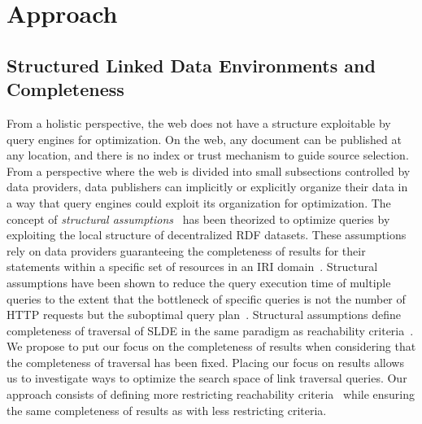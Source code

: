 \section{Approach}




\subsection{Structured Linked Data Environments and Completeness}\label{sec:slde}
From a holistic perspective, the web does not have a structure exploitable by query engines for optimization.
On the web, any document can be published at any location, and there is no index or trust mechanism to guide source selection.
From a perspective where the web is divided into small subsections controlled by data providers, data publishers can implicitly or explicitly organize their data  
in a way that query engines could exploit its organization for optimization.
The concept of \emph{structural assumptions}~\cite{Taelman2023} has been theorized to optimize queries by exploiting the local structure of decentralized RDF datasets.
These assumptions rely on data providers guaranteeing the completeness of results for their statements within a specific set of resources in an IRI domain~\cite{Bogaerts2021LinkTW}.
Structural assumptions have been shown to reduce the query execution time of multiple queries to the extent that the bottleneck of specific queries is not the number of HTTP requests but the suboptimal query plan~\cite{Taelman2023, eschauzier_quweda_linkqueue_2023}.
Structural assumptions define completeness of traversal of SLDE in the same paradigm as reachability criteria~\cite{Hartig2012}.
We propose to put our focus on the completeness of results when considering that the completeness of traversal has been fixed.
Placing our focus on results allows us to investigate ways to optimize the search space of link traversal queries.
Our approach consists of defining more restricting reachability criteria~\cite{Hartig2012} while ensuring the same completeness of results as with less restricting criteria.


